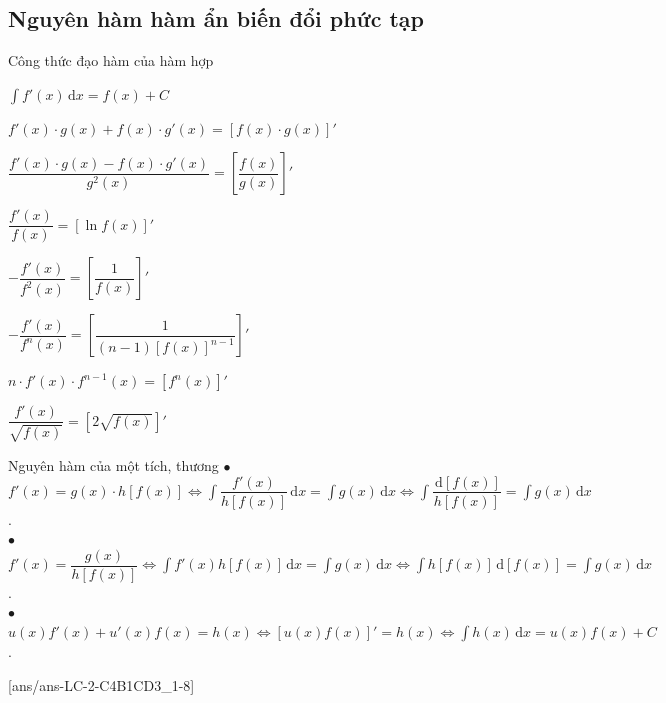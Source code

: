 \newpage
\subsection{Nguyên hàm hàm ẩn biến đổi phức tạp}

\begin{khung4}{Công thức đạo hàm của hàm hợp}
	\begin{listEX}[2]%
		\item $\int{f'(x)\mathrm{\,d}x}=f(x)+C$
		\item $f'(x)\cdot g(x)+f(x)\cdot g'(x)=\left[f(x)\cdot g(x)\right]'$
		\item $\dfrac{f'(x)\cdot g(x)-f(x)\cdot g'(x)}{g^2(x)} =\left[\dfrac{f(x)}{g(x)}\right]'$
		\item $\dfrac{f'(x)}{f(x)}=\left[\ln f(x) \right]'$
		\item $-\dfrac{f'(x)}{f^2(x)}=\left[ \dfrac{1}{f(x)} \right]'$
		\item $-\dfrac{f'(x)}{f^n(x)}=\left[ \dfrac{1}{(n-1)\left[ f(x) \right]^{n-1}} \right]'$
		\item $n\cdot f'(x)\cdot f^{n-1}(x)=\left[ f^n(x) \right]'$
		\item $\dfrac{f'(x)}{\sqrt{f(x)}}=\left[ 2\sqrt{f(x)} \right]'$
	\end{listEX}
\end{khung4}

\begin{dang}{Nguyên hàm của một tích, thương}
	$\bullet$ $f'(x)=g(x) \cdot h[f(x)] \Leftrightarrow \displaystyle\int \dfrac{f'(x)}{h[f(x)]}\mathrm{\,d}x =\int  {g(x)}\mathrm{\,d}x \Leftrightarrow \int\dfrac{\mathrm{\,d}\left[ f(x) \right]}{h\left[ f(x) \right]} =\int  {g(x)\mathrm{\,d}x}$.\\
	$\bullet$ $f'(x) = \dfrac{g(x)}{h[f(x)]} \Leftrightarrow \displaystyle \int f'(x)h[f(x)]\mathrm{\,d}x=\int g(x)\mathrm{\,d}x \Leftrightarrow \int h[f(x)]\mathrm{\,d}\left[ f(x) \right]=\int g(x)\mathrm{\,d}x$.\\
	$\bullet$ $u(x)f'(x)+u'(x)f(x)=h(x) \Leftrightarrow [u(x)f(x)]'=h(x) \Leftrightarrow \displaystyle\int h(x)\mathrm{\,d}x=u(x)f(x)+C$.
\end{dang}

[ans/ans-LC-2-C4B1CD3_1-8]

